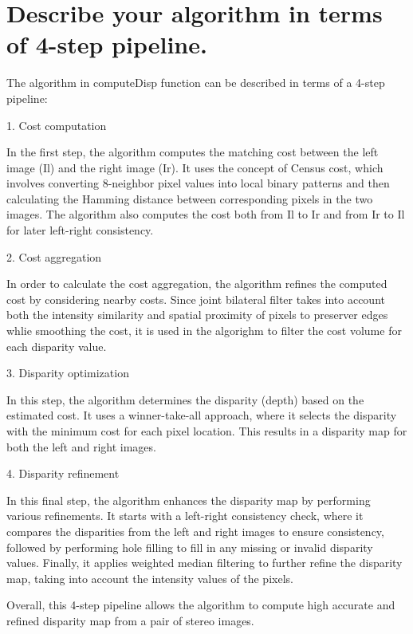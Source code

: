 \documentclass[a4paper, 12pt]{article}
\begin{document}
\section{Describe your algorithm in terms of 4-step pipeline.}
The algorithm in computeDisp function can be described in terms of a 4-step pipeline:

1. Cost computation

In the first step, the algorithm computes the matching cost between the left image (Il) and the right image (Ir). It uses the concept of Census cost, which involves converting 8-neighbor pixel values into local binary patterns and then calculating the Hamming distance between corresponding pixels in the two images. The algorithm also computes the cost both from Il to Ir and from Ir to Il for later left-right consistency.

2. Cost aggregation

In order to calculate the cost aggregation, the algorithm refines the computed cost by considering nearby costs. Since joint bilateral filter takes into account both the intensity similarity and spatial proximity of pixels to preserver edges whlie smoothing the cost, it is used in the algorighm to filter the cost volume for each disparity value.

3. Disparity optimization

In this step, the algorithm determines the disparity (depth) based on the estimated cost. It uses a winner-take-all approach, where it selects the disparity with the minimum cost for each pixel location. This results in a disparity map for both the left and right images.

4. Disparity refinement

In this final step, the algorithm enhances the disparity map by performing various refinements. It starts with a left-right consistency check, where it compares the disparities from the left and right images to ensure consistency, followed by performing hole filling to fill in any missing or invalid disparity values. Finally, it applies weighted median filtering to further refine the disparity map, taking into account the intensity values of the pixels.

Overall, this 4-step pipeline allows the algorithm to compute high accurate and refined disparity map from a pair of stereo images.

% 
% 
\end{document}
